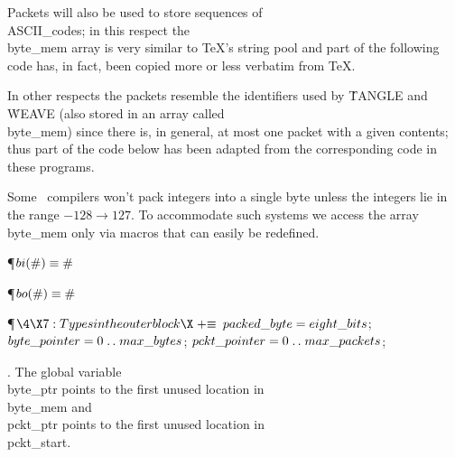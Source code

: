 Packets will also be used to store sequences of \\{ASCII\_code}s; in this
respect the \\{byte\_mem} array is very similar to \TeX's string pool and
part of the following code has, in fact, been copied more or less
verbatim from \TeX.

In other respects the packets resemble the identifiers used by
\.{TANGLE} and \.{WEAVE} (also stored in an array called \\{byte\_mem})
since there is, in general, at most one packet with a given contents;
thus part of the code below has been adapted from the corresponding code
in these programs.

Some \PASCAL\ compilers won't pack integers into a single byte unless the
integers lie in the range $-128\to127$. To accommodate such systems we
access the array \\{byte\_mem} only via macros that can easily be redefined.

\Y\P\D {}$\\{bi}(\#)\S\#$%
\par
\P\D {}$\\{bo}(\#)\S\#$\par
\Y\P$\4\X7:Types in the outer block\X\mathrel{+}\S$\6
$\\{packed\_byte}=\\{eight\_bits}$;\6
$\\{byte\_pointer}=0\to\\{max\_bytes}$;\6
$\\{pckt\_pointer}=0\to\\{max\_packets}$;\par
\fi

. The global variable \\{byte\_ptr} points to the first unused location in
\\{byte\_mem} and \\{pckt\_ptr} points to the first unused location in
\\{pckt\_start}.

